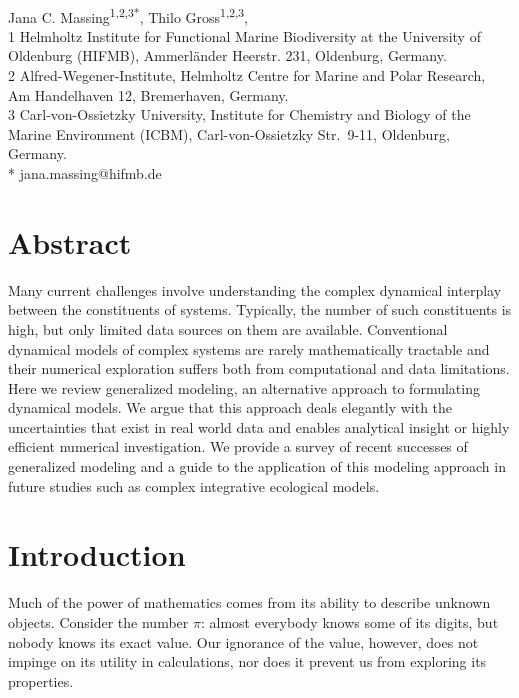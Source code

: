 \documentclass{article}
\begin{document}
\begin{flushleft}
{\Large
\textbf{}
}
\newline
\\
Jana C. Massing\textsuperscript{1,2,3*},
Thilo Gross\textsuperscript{1,2,3},
\\
\bigskip
{1} Helmholtz Institute for Functional Marine Biodiversity at the University of Oldenburg (HIFMB), Ammerl\"ander Heerstr. 231, Oldenburg, Germany.
\\
{2}  Alfred-Wegener-Institute, Helmholtz Centre for Marine and Polar Research, Am Handelhaven 12, Bremerhaven, Germany.
\\
{3} Carl-von-Ossietzky University, Institute for Chemistry and Biology of the Marine Environment (ICBM), Carl-von-Ossietzky Str.~9-11, Oldenburg, Germany.
\\
\bigskip
* jana.massing@hifmb.de

\end{flushleft}


\section*{Abstract}
Many current challenges involve understanding the complex dynamical interplay between the constituents of systems. Typically, the number of such constituents is high, but only limited data sources on them are available. Conventional dynamical models of complex systems are rarely mathematically tractable and their numerical exploration suffers both from computational and data limitations. Here we review generalized modeling, an alternative approach to formulating dynamical models. We argue that this approach deals elegantly with the uncertainties that exist in real world data and enables analytical insight or highly efficient numerical investigation. We provide a survey of recent successes of generalized modeling and a guide to the application of this modeling approach in future studies such as complex integrative ecological models.  


\section{Introduction}
Much of the power of mathematics comes from its ability to describe unknown objects. Consider the number $\pi$: almost everybody knows some of its digits, but nobody knows its exact value. Our ignorance of the value, however, does not impinge on its utility in calculations, nor does it prevent us from exploring its properties.
\end{document}
